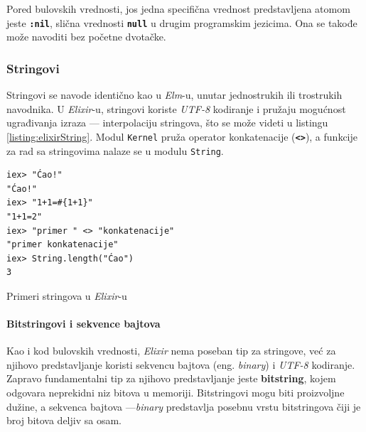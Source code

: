 \documentclass[12pt,oneside]{memoir}
\begin{document}
Pored bulovskih vrednosti, jos jedna specifična vrednost predstavljena atomom jeste
\texttt{\textbf{:nil}}, slična vrednosti \texttt{\textbf{null}} u drugim programskim jezicima.
Ona se takođe može navoditi bez početne dvotačke.
\subsubsection{Stringovi}
Stringovi se navode identično kao u \emph{Elm}-u, unutar jednostrukih ili trostrukih navodnika. 
U \emph{Elixir}-u, stringovi koriste \emph{UTF-8} kodiranje i pružaju mogućnost ugrađivanja izraza --- interpolaciju
stringova, što se može videti u listingu \ref{listing:elixirString}. Modul \texttt{Kernel}
pruža operator konkatenacije (\texttt{\textbf{<>}}), a funkcije za rad sa stringovima nalaze
se u modulu \texttt{String}.
\begin{listing}[!h]
\begin{verbatim}
iex> "Ćao!"
"Ćao!"
iex> "1+1=#{1+1}"
"1+1=2"
iex> "primer " <> "konkatenacije"
"primer konkatenacije"
iex> String.length("Ćao")
3
\end{verbatim}
\caption{Primeri stringova u \emph{Elixir}-u}
\label{listing:elixirString}
\end{listing}
\paragraph{Bitstringovi i sekvence bajtova}
Kao i kod bulovskih vrednosti, \emph{Elixir} nema poseban tip za stringove, već za njihovo
predstavljanje koristi sekvencu bajtova (eng. \emph{binary}) i \emph{UTF-8} kodiranje.
Zapravo fundamentalni tip za njihovo predstavljanje jeste \textbf{bitstring}, kojem odgovara 
neprekidni niz bitova u memoriji. Bitstringovi mogu biti proizvoljne dužine, a sekvenca
bajtova ---\emph{binary} predstavlja posebnu vrstu bitstringova čiji je broj bitova deljiv sa
osam. 
\end{document}
